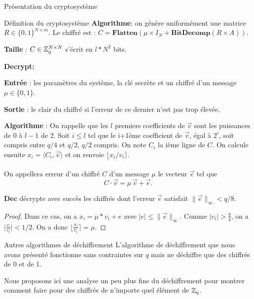 \begin{section}{Présentation du cryptosystème}
\begin{subsection}{Définition du cryptosystème}
	\textbf{Algorithme}: on génère uniformément une matrice $R \in \{ 0,1\} ^{N \times m}$. Le chiffré est : $C = \textbf{Flatten}(\mu \times I_N + \textbf{BitDecomp}(R \times A))$.

	\textbf{Taille} : $C \in \mathbb{Z}_q^{N \times N}$ s'écrit en $l * N^2$ bits.
	
\vspace{0.5cm}\noindent\textbf{Decrypt:}
\flushleft
	
	\textbf{Entrée} : les paramètres du système, la clé secrète et un chiffré d'un message $\mu \in \{ 0,1\} $.

	\textbf{Sortie} : le clair du chiffré si l'erreur de ce dernier n'est pas trop élevée.

	\textbf{Algorithme} : On rappelle que les $l$ premiers coefficients de $\vec{v}$ sont les puissances de 0 à $l-1$ de 2. Soit $i \leqslant l$ tel que le i+1ème coefficient de $\vec{v}$, égal à $2^{i}$, soit compris entre $q/4$ et $q/2$, $q/2$ compris. On note $C_i$ la ième ligne de $C$. On calcule ensuite $x_i = \langle C_i, \vec{v} \rangle$ et on renvoie $\lfloor x_i/v_i \rceil$.


\paragraph{}
\begin{definition}
On appellera erreur d'un chiffré $C$ d'un message $\mu$ le vecteur $\vec{e}$ tel que
\[ C\cdot \vec{v} = \mu\, \vec{v} + \vec{e}. \]
\end{definition}

\begin{prop}
\label{dec}
\textbf{Dec} décrypte avec succès les chiffrés dont l'erreur $\vec{e}$ satisfait $\|\vec{e}\|_\infty < q/8$.
\end{prop}
\begin{proof}
	Dans ce cas, on a $x_i = \mu * v_i + e$ avec $\lvert e \lvert \leqslant \|\vec{e}\|_\infty$. Comme $\lvert v_i \lvert > \frac{q}{4}$, on a $\lvert \frac{e}{v_i} \lvert < 1/2$. On a donc $\lfloor \frac{x_i}{v_i} \rceil = \mu$.
\end{proof}
	\end{subsection}
	
\begin{subsection}{Autres algorithmes de déchiffrement}
	L'algorithme de déchiffrement que nous avons présenté fonctionne sans contraintes sur $q$ mais ne déchiffre que des chiffrés de 0 et de 1.

	Nous proposons ici une analyse un peu plus fine du déchiffrement pour montrer comment faire pour des chiffrés de n'importe quel élément de $\mathbb{Z}_q$.


\end{subsection}
\end{section}
